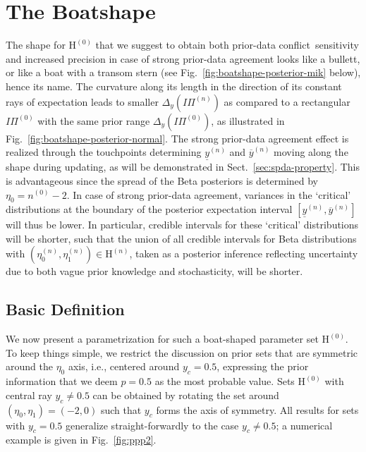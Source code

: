 \documentclass[runningheads,a4paper]{llncs}
\def\pdc{prior-data conflict}
\newcommand{\uz}{^{(0)}} %
\newcommand{\un}{^{(n)}} %
\newcommand{\ul}[1]{\underline{#1}}
\newcommand{\ol}[1]{\overline{#1}}
\def\ynl{\ul{y}\un}
\def\ynu{\ol{y}\un}
\def\nz{n\uz}
\def\PZ{I\!\!\Pi\uz}
\def\PN{I\!\!\Pi\un}
\def\EZ{\mathrm{H}\uz}
\def\EN{\mathrm{H}\un}
\def\ezn{\eta_0\un}
\def\eon{\eta_1\un}
\begin{document}
\section{The Boatshape}
\label{sec:boatshape}

The shape for $\EZ$ that we suggest to obtain both \pdc\ sensitivity and increased precision
in case of strong prior-data agreement looks like a bullett, or like a boat with a transom stern
(see Fig.~\ref{fig:boatshape-posterior-mik} below), hence its name.
The curvature along its length in the direction of its constant rays of expectation
leads to smaller $\Delta_y(\PN)$ as compared to a rectangular $\PZ$ with the same prior range $\Delta_y(\PZ)$,
as illustrated in Fig.~\ref{fig:boatshape-posterior-normal}.
%
The strong prior-data agreement effect is realized
through the touchpoints determining $\ynl$ and $\ynu$
moving along the shape during updating,
as will be demonstrated in Sect.~\ref{sec:spda-property}.
This is advantageous since the spread of the Beta posteriors is determined by $\eta_0 = \nz - 2$.
In case of strong prior-data agreement, variances in the `critical' distributions
at the boundary of the posterior expectation interval $[\ynl,\ynu]$ will thus be lower.
In particular, credible intervals for these `critical' distributions will be shorter, 
such that the union of all credible intervals for Beta distributions with $(\ezn, \eon) \in \EN$,
taken as a posterior inference reflecting uncertainty due to both vague prior knowledge and stochasticity, will be shorter.
%

\subsection{Basic Definition}
\label{sec:basicdefboat}

We now present a parametrization for such a boat-shaped parameter set $\EZ$.
To keep things simple, we restrict the discussion on prior sets
that are symmetric around the $\eta_0$ axis, i.e., centered around $y_c = 0.5$,
expressing the prior information that we deem $p=0.5$ as the most probable value. 
Sets $\EZ$ with central ray $y_c \neq 0.5$ can be obtained
by rotating the set around $(\eta_0, \eta_1) = (-2,0)$ such that $y_c$ forms the axis of symmetry.
All results for sets with $y_c = 0.5$ generalize straight-forwardly to the case $y_c \neq 0.5$;
a numerical example is given in Fig.~\ref{fig:ppp2}.
\end{document}
